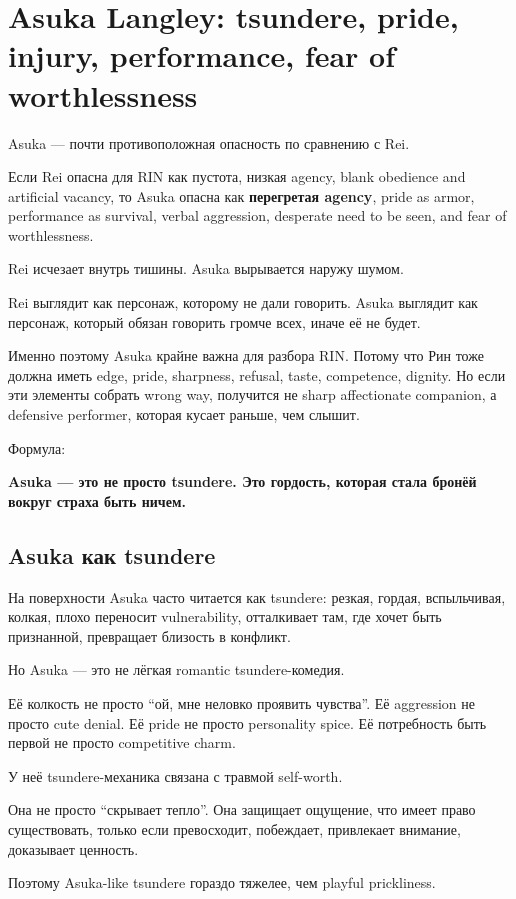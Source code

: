 \section{Asuka Langley: tsundere, pride, injury, performance, fear of worthlessness}

Asuka --- почти противоположная опасность по сравнению с Rei.

Если Rei опасна для RIN как пустота, низкая agency, blank obedience and
artificial vacancy, то Asuka опасна как \textbf{перегретая agency},
pride as armor, performance as survival, verbal aggression, desperate
need to be seen, and fear of worthlessness.

Rei исчезает внутрь тишины. Asuka вырывается наружу шумом.

Rei выглядит как персонаж, которому не дали говорить. Asuka выглядит как
персонаж, который обязан говорить громче всех, иначе её не будет.

Именно поэтому Asuka крайне важна для разбора RIN. Потому что Рин тоже
должна иметь edge, pride, sharpness, refusal, taste, competence,
dignity. Но если эти элементы собрать wrong way, получится не sharp
affectionate companion, а defensive performer, которая кусает раньше,
чем слышит.

Формула:

\textbf{Asuka --- это не просто tsundere. Это гордость, которая стала
бронёй вокруг страха быть ничем.}

\subsection*{Asuka как tsundere}

На поверхности Asuka часто читается как tsundere: резкая, гордая,
вспыльчивая, колкая, плохо переносит vulnerability, отталкивает там, где
хочет быть признанной, превращает близость в конфликт.

Но Asuka --- это не лёгкая romantic tsundere-комедия.

Её колкость не просто ``ой, мне неловко проявить чувства''. Её
aggression не просто cute denial. Её pride не просто personality spice.
Её потребность быть первой не просто competitive charm.

У неё tsundere-механика связана с травмой self-worth.

Она не просто ``скрывает тепло''. Она защищает ощущение, что имеет право
существовать, только если превосходит, побеждает, привлекает внимание,
доказывает ценность.

Поэтому Asuka-like tsundere гораздо тяжелее, чем playful prickliness.

